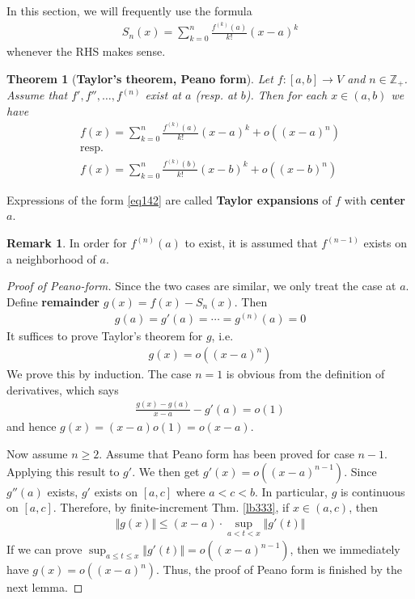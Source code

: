 \documentclass[12pt,b5paper,notitlepage]{article}
\theoremstyle{definition}
\newtheorem{rem}[df]{Remark}
\theoremstyle{plain}
\newtheorem{thm}[df]{Theorem}
\newcommand{\Zbb}{\mathbb Z}
\numberwithin{equation}{section}
\begin{document}
In this section, we will frequently use the formula
\begin{align}
S_n(x)=\sum_{k=0}^n\frac{f^{(k)}(a)}{k!}(x-a)^k
\end{align}
whenever the RHS makes sense.


\begin{thm}[\textbf{Taylor's theorem, Peano form}]\label{lb360}
Let $f:[a,b]\rightarrow V$ and $n\in\Zbb_+$. Assume that $f',f'',\dots,f^{(n)}$ exist at $a$ (resp. at $b$). Then for each $x\in (a,b)$ we have
\begin{subequations}
\begin{gather}
f(x)=\sum_{k=0}^n\frac{f^{(k)}(a)}{k!}(x-a)^k+o((x-a)^n)\label{eq142}\\
\text{resp.}\nonumber\\
f(x)=\sum_{k=0}^n\frac{f^{(k)}(b)}{k!}(x-b)^k+o((x-b)^n) \label{eq143}
\end{gather}
\end{subequations}
\end{thm}


Expressions of the form \eqref{eq142} are called \textbf{Taylor expansions}  of $f$ with \textbf{center} $a$.

\begin{rem}
In order for $f^{(n)}(a)$ to exist, it is assumed that $f^{(n-1)}$ exists on a neighborhood of $a$.
\end{rem}


\begin{proof}[Proof of Peano-form]
Since the two cases are similar, we only treat the case at $a$. Define \textbf{remainder}  $g(x)=f(x)-S_n(x)$. Then
\begin{align}
g(a)=g'(a)=\cdots=g^{(n)}(a)=0  \label{eq140}
\end{align}
It suffices to prove Taylor's theorem for $g$, i.e.
\begin{align}
g(x)=o((x-a)^n)
\end{align}
We prove this by induction. The case $n=1$ is obvious from the definition of derivatives, which says
\begin{align}
\frac{g(x)-g(a)}{x-a}-g'(a)=o(1)
\end{align}
and hence $g(x)=(x-a)o(1)=o(x-a)$. 

Now assume $n\geq 2$. Assume that Peano form has been proved for case $n-1$. Applying this result to $g'$. We then get $g'(x)=o((x-a)^{n-1})$. Since $g''(a)$ exists,  $g'$ exists on $[a,c]$ where $a<c<b$. In particular, $g$ is continuous on $[a,c]$. Therefore, by finite-increment Thm. \ref{lb333}, if $x\in(a,c)$, then
\begin{align*}
\Vert g(x)\Vert\leq (x-a)\cdot\sup_{a<t<x}\Vert g'(t)\Vert
\end{align*}
If we can prove $\sup_{a\leq t\leq x}\Vert g'(t)\Vert=o((x-a)^{n-1})$, then we immediately have $g(x)=o((x-a)^n)$. Thus, the proof of Peano form is finished by the next lemma.
\end{proof}
\end{document}
